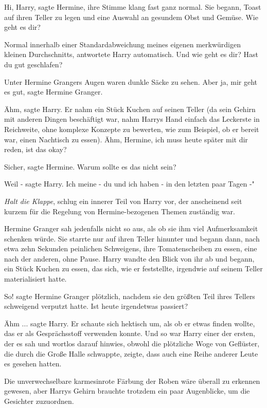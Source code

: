 \glqq{}Hi, Harry\grqq{}, sagte Hermine, ihre Stimme klang fast ganz normal. Sie
begann, Toast auf ihren Teller zu legen und eine Auswahl an gesundem Obst und
Gemüse. \glqq{}Wie geht es dir?\grqq{}

\glqq{}Normal innerhalb einer Standardabweichung meines eigenen merkwürdigen
kleinen Durchschnitts\grqq{}, antwortete Harry automatisch. \glqq{}Und wie geht
es dir? Hast du gut geschlafen?\grqq{}

Unter Hermine Grangers Augen waren dunkle Säcke zu sehen. \glqq{}Aber ja, mir
geht es gut\grqq{}, sagte Hermine Granger.

\glqq{}Ähm\grqq{}, sagte Harry. Er nahm ein Stück Kuchen auf seinen Teller (da
sein Gehirn mit anderen Dingen beschäftigt war, nahm Harrys Hand einfach das
Leckerste in Reichweite, ohne komplexe Konzepte zu bewerten, wie zum Beispiel,
ob er bereit war, einen Nachtisch zu essen). \glqq{}Ähm, Hermine, ich muss heute
später mit dir reden, ist das okay?\grqq{}

\glqq{}Sicher\grqq{}, sagte Hermine. \glqq{}Warum sollte es das nicht sein?\grqq{}

\glqq{}Weil -\grqq{} sagte Harry. \glqq{}Ich meine - du und ich haben - in den
letzten paar Tagen -"

\emph{Halt die Klappe}, schlug ein innerer Teil von Harry vor, der anscheinend
seit kurzem für die Regelung von Hermine-bezogenen Themen zuständig war.

Hermine Granger sah jedenfalls nicht so aus, als ob sie ihm viel Aufmerksamkeit
schenken würde. Sie starrte nur auf ihren Teller hinunter und begann dann, nach
etwa zehn Sekunden peinlichen Schweigens, ihre Tomatenscheiben zu essen, eine
nach der anderen, ohne Pause. Harry wandte den Blick von ihr ab und begann, ein
Stück Kuchen zu essen, das sich, wie er feststellte, irgendwie auf seinem Teller
materialisiert hatte.

\glqq{}So!\grqq{} sagte Hermine Granger plötzlich, nachdem sie den größten Teil
ihres Tellers schweigend verputzt hatte. \glqq{}Ist heute irgendetwas
passiert?\grqq{}

\glqq{}Ähm ...\grqq{} sagte Harry. Er schaute sich hektisch um, als ob er etwas
finden wollte, das er als Gesprächsstoff verwenden konnte. Und so war Harry
einer der ersten, der es sah und wortlos darauf hinwies, obwohl die plötzliche
Woge von Geflüster, die durch die Große Halle schwappte, zeigte, dass auch eine
Reihe anderer Leute es gesehen hatten.

Die unverwechselbare karmesinrote Färbung der Roben wäre überall zu erkennen
gewesen, aber Harrys Gehirn brauchte trotzdem ein paar Augenblicke, um die
Gesichter zuzuordnen.

